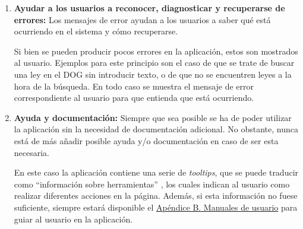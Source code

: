 \begin{enumerate}
    
    \item {\bf Ayudar a los usuarios a reconocer, diagnosticar y recuperarse de errores:} Los mensajes de error ayudan a los usuarios a saber qué está ocurriendo en el sistema y cómo recuperarse.
    
    Si bien se pueden producir pocos errores en la aplicación, estos son mostrados al usuario. Ejemplos para este principio son el caso de que se trate de buscar una ley en el DOG sin introducir texto, o de que no se encuentren leyes a la hora de la búsqueda. En todo caso se muestra el mensaje de error correspondiente al usuario para que entienda que está ocurriendo.
    
    
    \item {\bf Ayuda y documentación:} Siempre que sea posible se ha de poder utilizar la aplicación sin la necesidad de documentación adicional. No obstante, nunca está de más añadir posible ayuda y/o documentación en caso de ser esta necesaria.
    
    En este caso la aplicación contiene una serie de {\it tooltips}, que se puede traducir como ``información sobre herramientas'' \cite{infoherramientas}, los cuales indican al usuario como realizar diferentes acciones en la página. Además, si esta información no fuese suficiente, siempre estará disponible el \hyperref[enlacemanualusuario]{Apéndice B. Manuales de usuario} para guiar al usuario en la aplicación.
\end{enumerate}